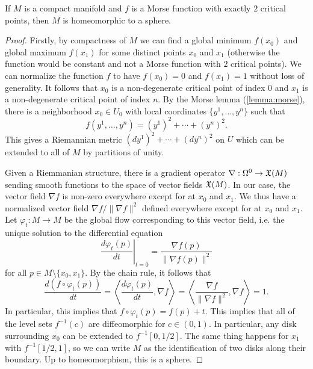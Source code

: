 \begin{theorem}[Reeb]\label{thm:reeb}
	If $M$ is a compact manifold and $f$ is a Morse function with exactly $2$ critical points, then $M$ is homeomorphic to a sphere.
\end{theorem}
\begin{proof}
	Firstly, by compactness of $M$ we can find a global minimum $f(x_0)$ and global maximum $f(x_1)$ for some distinct points $x_0$ and $x_1$ (otherwise the function would be constant and not a Morse function with $2$ critical points). We can normalize the function $f$ to have $f(x_0)=0$ and $f(x_1)=1$ without loss of generality. It follows that $x_0$ is a non-degenerate critical point of index 0 and $x_1$ is a non-degenerate critical point of index $n$.
	By the Morse lemma (\ref{lemma:morse}), there is a neighborhood $x_0\in U_0$ with local coordinates $\{y^1,\ldots, y^n\}$ such that
	\begin{equation}
		f(y^1,\ldots, y^n) = (y^1)^2 + \cdots + (y^n)^2.
	\end{equation}
	This gives a Riemannian metric $(dy^1)^2+\cdots+(dy^n)^2$ on $U$ which can be extended to all of $M$ by partitions of unity.

	Given a Riemmanian structure, there is a gradient operator $\nabla : \Omega^0 \to \operatorname{\mathfrak{X}}(M)$ sending smooth functions to the space of vector fields $\operatorname{\mathfrak{X}}(M)$.
	In our case, the vector field $\nabla f$ is non-zero everywhere except for at $x_0$ and $x_1$. We thus have a normalized vector field $\nabla f/\|\nabla f\|^2$
	defined everywhere except for at $x_0$ and $x_1$. Let $\varphi_t : M \to M$ be the global flow corresponding to this vector field, i.e. the unique solution to the differential equation
	\begin{equation}
		\left.\frac{d\varphi_t(p)}{dt}\right|_{t=0} = \frac{\nabla f(p)}{\|\nabla f(p)\|^2}
	\end{equation}
	for all $p\in M\setminus \{x_0,x_1\}$. By the chain rule, it follows that
	\begin{equation}
		\frac{d(f\circ \varphi_t(p))}{dt}=\left\langle \frac{d\varphi_t(p)}{dt}, \nabla f\right\rangle = \left\langle \frac{\nabla f}{\|\nabla f\|^2}, \nabla f\right\rangle=1.
	\end{equation}
	In particular, this implies that $f\circ \varphi_t(p) = f(p)+t$. This implies that all of the level sets $f^{-1}(c)$ are diffeomorphic for $c\in (0,1)$. In particular, any disk surrounding $x_0$ can be extended to $f^{-1}[0,1/2]$. The same thing happens for $x_1$ with $f^{-1}[1/2,1]$, so we can write $M$ as the identification of two disks along their boundary. Up to homeomorphism, this is a sphere.
\end{proof}

